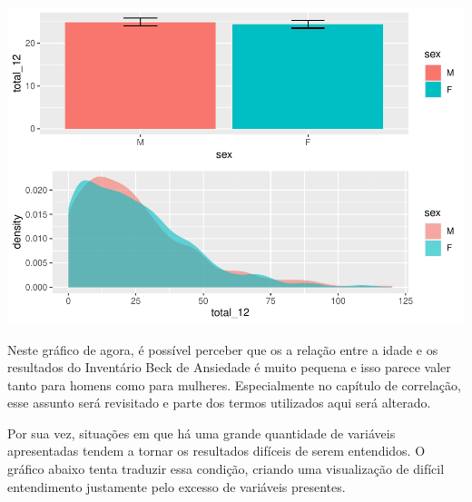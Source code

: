 \documentclass[
]{book}
\newenvironment{Shaded}{\begin{snugshade}}{\end{snugshade}}
\newcommand{\DataTypeTok}[1]{\textcolor[rgb]{0.13,0.29,0.53}{#1}}
\newcommand{\KeywordTok}[1]{\textcolor[rgb]{0.13,0.29,0.53}{\textbf{#1}}}
\newcommand{\NormalTok}[1]{#1}
\newcommand{\OperatorTok}[1]{\textcolor[rgb]{0.81,0.36,0.00}{\textbf{#1}}}
\newcommand{\StringTok}[1]{\textcolor[rgb]{0.31,0.60,0.02}{#1}}
\begin{document}
\begin{center}\includegraphics{gitbook-demo_files/figure-latex/unnamed-chunk-32-1} \end{center}

Neste gráfico de agora, é possível perceber que os a relação entre a idade e os resultados do Inventário Beck de Ansiedade é muito pequena e isso parece valer tanto para homens como para mulheres. Especialmente no capítulo de correlação, esse assunto será revisitado e parte dos termos utilizados aqui será alterado.

Por sua vez, situações em que há uma grande quantidade de variáveis apresentadas tendem a tornar os resultados difíceis de serem entendidos. O gráfico abaixo tenta traduzir essa condição, criando uma visualização de difícil entendimento justamente pelo excesso de variáveis presentes.

\begin{Shaded}
\end{Shaded}
\end{document}
